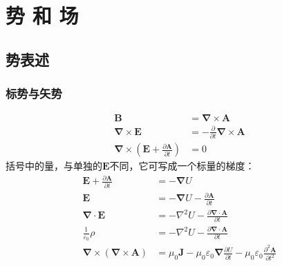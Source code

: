 \cleardoublepage
\section{势 和 场}
\subsection{势表述}
\subsubsection{标势与矢势}
\begin{align*}
    \boldsymbol{B}&=\boldsymbol{\nabla}\times\boldsymbol{A}\\
\boldsymbol{\nabla}\times\boldsymbol{E}&=-\frac{\partial}{\partial t}\boldsymbol{\nabla}\times\boldsymbol{A}\\
\boldsymbol{\nabla}\times\left(\boldsymbol{E}+\frac{\partial\boldsymbol{A}}{\partial t}\right)&=0
\end{align*}
括号中的量，与单独的$\boldsymbol{E}$不同，它可写成一个标量的梯度：
\begin{align}
    \boldsymbol{E}+\frac{\partial\boldsymbol{A}}{\partial t}&=-\boldsymbol{\nabla}U\\
    \boldsymbol{E}&=-\boldsymbol{\nabla}U-\frac{\partial\boldsymbol{A}}{\partial t}\\
    \boldsymbol{\nabla}\cdot\boldsymbol{E}&=-\nabla^2U-\frac{\partial\boldsymbol{\boldsymbol{\nabla}\cdot A}}{\partial t}\\
    \frac{1}{\varepsilon_0}\rho&=-\nabla^2U-\frac{\partial\boldsymbol{\boldsymbol{\nabla}\cdot A}}{\partial t}\\
    \boldsymbol{\nabla}\times\left(\boldsymbol{\nabla}\times\boldsymbol{A}\right)&=\mu_0\boldsymbol{J}
    -\mu_0\varepsilon_0\boldsymbol{\nabla}\frac{\partial U}{\partial t}
    -\mu_0\varepsilon_0\frac{\partial^2\boldsymbol{A}}{\partial t^2}
\end{align}
